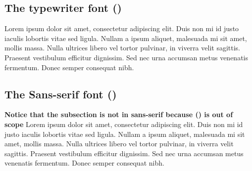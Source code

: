 \documentclass[letterpaper, 12pt]{article}
\begin{document}
\ttfamily
  \subsection{\ttfamily The typewriter font (\ttfamilyEx)} 
Lorem ipsum dolor sit amet, consectetur adipiscing elit. Duis non mi id justo iaculis lobortis vitae sed ligula. Nullam a ipsum aliquet, malesuada mi sit amet, mollis massa.
Nulla ultrices libero vel tortor pulvinar, in viverra velit sagittis. Praesent vestibulum efficitur dignissim. Sed nec urna accumsan metus venenatis fermentum. 
Donec semper consequat nibh. 

\sffamily 
  \subsection{The Sans-serif font (\sffamilyEx)} 
  \textbf{Notice that the subsection is not in sans-serif because (\sffamilyEx) is out of scope}
Lorem ipsum dolor sit amet, consectetur adipiscing elit. Duis non mi id justo iaculis lobortis vitae sed ligula. 
Nullam a ipsum aliquet, malesuada mi sit amet, mollis massa. Nulla ultrices libero vel tortor pulvinar, in viverra velit sagittis. Praesent vestibulum efficitur dignissim. 
Sed nec urna accumsan metus venenatis fermentum. Donec semper consequat nibh.\
\end{document}
